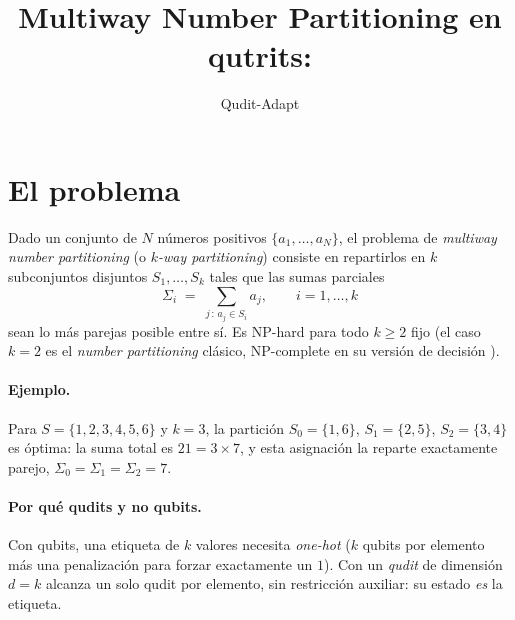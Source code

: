 \documentclass[11pt]{article}
\title{Multiway Number Partitioning en qutrits:}
\author{Qudit-Adapt}
\date{}
\begin{document}
\maketitle

\section{El problema}

Dado un conjunto de $N$ n\'umeros positivos $\{a_1,\dots,a_N\}$, el problema
de \emph{multiway number partitioning} (o \emph{$k$-way partitioning})
consiste en repartirlos en $k$ subconjuntos disjuntos $S_1,\dots,S_k$ tales
que las sumas parciales
\[
  \Sigma_i \;=\; \sum_{j \,:\, a_j \in S_i} a_j , \qquad i=1,\dots,k
\]
sean lo m\'as parejas posible entre s\'i. Es NP-hard para todo $k\geq 2$ fijo
(el caso $k=2$ es el \emph{number partitioning} cl\'asico, NP-complete en su
versi\'on de decisi\'on \cite{mertens2003}).

\paragraph{Ejemplo.} Para $S=\{1,2,3,4,5,6\}$ y $k=3$, la partici\'on
$S_0=\{1,6\}$, $S_1=\{2,5\}$, $S_2=\{3,4\}$ es \'optima: la suma total es
$21=3\times7$, y esta asignaci\'on la reparte exactamente parejo,
$\Sigma_0=\Sigma_1=\Sigma_2=7$.

\begin{center}
\end{center}

\paragraph{Por qu\'e qudits y no qubits.} Con qubits, una etiqueta de $k$
valores necesita \emph{one-hot} ($k$ qubits por elemento m\'as una
penalizaci\'on para forzar exactamente un $1$). Con un \emph{qudit} de
dimensi\'on $d=k$ alcanza un solo qudit por elemento, sin restricci\'on
auxiliar: su estado \emph{es} la etiqueta.
\end{document}
